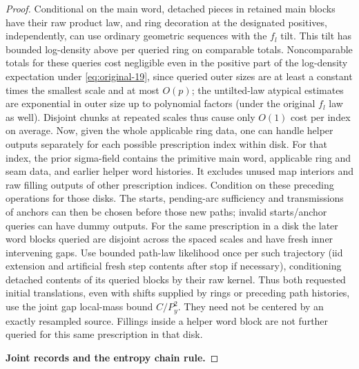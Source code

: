 \begin{proof}
Conditional on the main word, detached pieces in retained main blocks have their raw
product law, and ring decoration at the designated positives, independently, can use
ordinary geometric sequences with the \(f_l\) tilt. This tilt has bounded log-density
above per queried ring on comparable totals. Noncomparable totals for these queries cost
negligible even in the positive part of the log-density expectation under
\eqref{eq:original-19}, since queried outer sizes are at least a constant times the
smallest scale and at most \(O(p)\); the untilted-law atypical estimates are exponential
in outer size up to polynomial factors (under the original \(f_l\) law as well). Disjoint
chunks at repeated scales thus cause only \(O(1)\) cost per index on average. Now, given
the whole applicable ring data, one can handle helper outputs separately for each possible
prescription index within disk. For that index, the prior sigma-field contains
the primitive main word, applicable ring and seam data, and earlier helper
word histories. It excludes unused map interiors and raw filling outputs of
other prescription indices. Condition on these preceding operations for those disks.
The starts, pending-arc sufficiency and transmissions of anchors can
then be chosen before those new paths; invalid starts/anchor queries can have dummy
outputs. For the same prescription in a disk the later word blocks queried are disjoint
across the spaced scales and have fresh inner intervening gaps. Use bounded path-law
likelihood once per such trajectory (iid extension and artificial fresh step contents
after stop if necessary), conditioning detached contents of its queried blocks by their
raw kernel. Thus both requested initial translations, even with shifts supplied by rings
or preceding path histories, use the joint gap local-mass bound \(C/P_y^2\). They need not
be centered by an exactly resampled source. Fillings inside a helper word block are not
further queried for this same prescription in that disk.

\smallskip
\noindent\textbf{Joint records and the entropy chain rule.}\quad


\end{proof}
